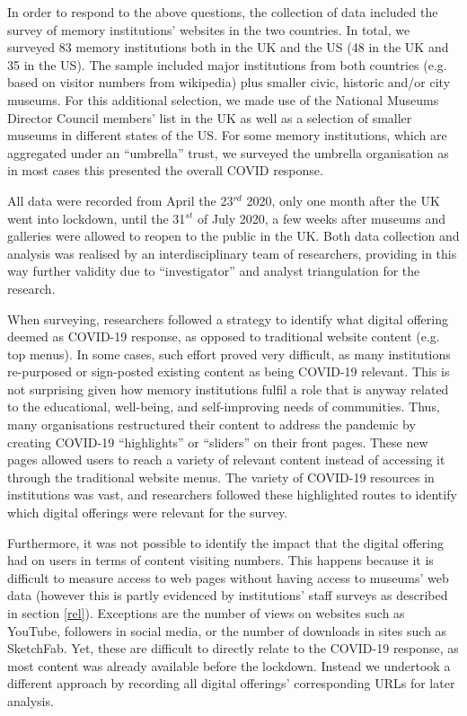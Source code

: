 \documentclass{egpubl}
\begin{document}
In order to respond to the above questions, the collection of data included the survey of memory institutions' websites in the two countries. In total, we surveyed 83 memory institutions both in the UK and the US (48 in the  UK and 35 in the US). The sample included major institutions from both countries (e.g. based on visitor numbers from wikipedia) \cite{Wikipedia,Wikipediaa} plus smaller civic, historic and/or city museums. For this additional selection, we made use of the National Museums Director Council members' list in the UK \cite{nationalmuseums:2020} as well as a selection of smaller museums in different states of the US. For some memory institutions, which are aggregated under an ``umbrella'' trust, we surveyed the umbrella organisation as in most cases this presented the overall COVID response.

All data were recorded from April the 23$^{rd}$  2020, only one month after the UK went into lockdown, until the 31$^{st}$ of July 2020, a few weeks after museums and galleries were allowed to reopen to the public in the UK. Both data collection and analysis was realised by an interdisciplinary team of researchers, providing in this way further validity due to ``investigator'' and analyst triangulation for the research.


When surveying, researchers followed a strategy to identify what digital offering deemed as COVID-19 response, as opposed to traditional website content (e.g. top menus). In some cases, such effort proved very difficult, as many institutions re-purposed or sign-posted existing content as being COVID-19 relevant. This is not surprising given how memory institutions fulfil a role that is anyway related to the educational, well-being, and self-improving needs of communities. Thus, many organisations restructured their content to address the pandemic by creating COVID-19 ``highlights'' or ``sliders'' on their front pages. These new pages allowed users to reach a variety of relevant content instead of accessing it through the traditional website menus. The variety of COVID-19 resources in institutions was vast, and researchers followed these highlighted routes to identify which digital offerings were relevant for the survey. 

Furthermore, it was not possible to identify the impact that the digital offering had on users in terms of content visiting numbers. This happens because it is difficult to measure access to web pages without having access to museums’ web data (however this is partly evidenced by institutions' staff surveys as described in section \ref{rel}). Exceptions are the number of views on websites such as YouTube, followers in social media, or the number of downloads in sites such as SketchFab. Yet, these are difficult to directly relate to the COVID-19 response, as most content was already available before the lockdown. Instead we undertook a different approach by recording all digital offerings' corresponding URLs for later analysis. 
\end{document}
